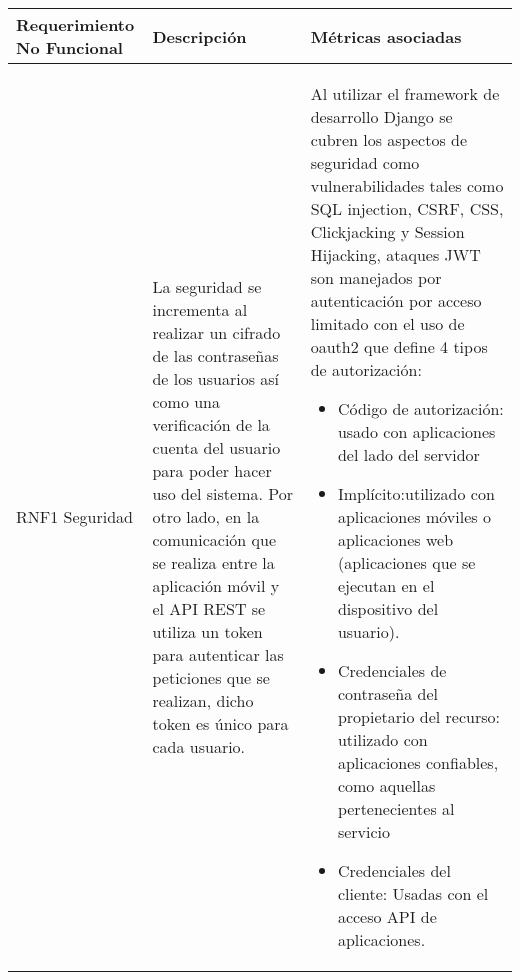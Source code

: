  \begin{center}
 	\begin{tabularx}{1.0\textwidth} { 
 			| >{\raggedright\arraybackslash}X 
 			| >{\arraybackslash}X 
 			| >{\raggedright\arraybackslash}X | }
 		\hline
 		
 		Requerimiento No Funcional & Descripción & Métricas asociadas  \\
 		\hline
 		RNF1 Seguridad  &  La seguridad se incrementa al realizar un cifrado de las contraseñas de los usuarios así como una verificación de la cuenta del usuario para poder hacer uso del sistema. Por otro lado, en la comunicación que se realiza entre la aplicación móvil y el API REST se utiliza un token para autenticar las peticiones que se realizan, dicho token es único para cada usuario.  &    Al utilizar el framework de desarrollo Django se cubren los aspectos de seguridad como vulnerabilidades tales como SQL injection, CSRF, CSS, Clickjacking y Session Hijacking, ataques JWT son manejados por autenticación por acceso limitado con el uso de oauth2 que define 4 tipos de autorización: 
 		\begin{itemize}
 			\item Código de autorización: usado con aplicaciones del lado del servidor
 			\item Implícito:utilizado con aplicaciones móviles o aplicaciones web (aplicaciones que se ejecutan en el dispositivo del usuario).
 			
 			\item Credenciales de contraseña del propietario del recurso: utilizado con aplicaciones confiables, como aquellas pertenecientes al servicio
 			\item Credenciales del cliente: Usadas con el acceso API de aplicaciones.
 		\end{itemize} \\
 		\hline
 		
 	\end{tabularx}
 	\begin{tabularx}{1.0\textwidth} { 
 			| >{\raggedright\arraybackslash}X 
 			| >{\arraybackslash}X 
 			| >{\raggedright\arraybackslash}X | }
 		

\end{tabularx}
\end{center}
